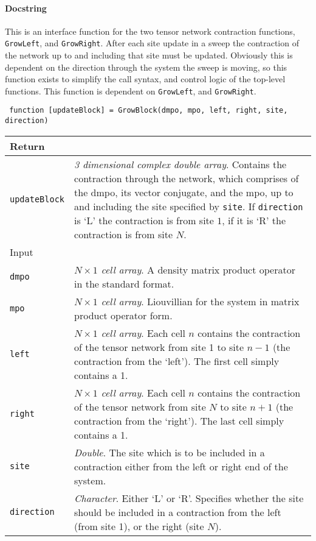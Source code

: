  \paragraph{Docstring} This is an interface function for the two tensor network contraction functions, \lstinline$GrowLeft$, and \lstinline$GrowRight$. After each site update in a sweep the contraction of the network up to and including that site must be updated. Obviously this is dependent on the direction through the system the sweep is moving, so this function exists to simplify the call syntax, and control logic of the top-level functions. This function is dependent on \lstinline$GrowLeft$, and \lstinline$GrowRight$.
 \begin{lstlisting}
 function [updateBlock] = GrowBlock(dmpo, mpo, left, right, site, direction) \end{lstlisting}
 \begin{longtabu}{X[1,1]X[4,1]}
 \hline
 Return & \\ \hline
 \lstinline$updateBlock$ & \emph{3 dimensional complex double array}. Contains the contraction through the network, which comprises of the dmpo, its vector conjugate, and the mpo, up to and including the site specified by \lstinline$site$. If \lstinline$direction$ is `L' the contraction is from site \(1\), if it is `R' the contraction is from site \(N\). \\ \hline
 Input & \\ \hline
 \lstinline$dmpo$ & \emph{\(N \times 1\) cell array}. A density matrix product operator in the standard format. \\
 \lstinline$mpo$ & \emph{\(N \times 1\) cell array}. Liouvillian for the system in matrix product operator form. \\
 \lstinline$left$ & \emph{\(N \times 1\) cell array}. Each cell \(n\) contains the contraction of the tensor network from site 1 to site \(n-1\) (the contraction from the `left'). The first cell simply contains a 1. \\
 \lstinline$right$ & \emph{\(N \times 1\) cell array}. Each cell \(n\) contains the contraction of the tensor network from site \(N\) to site \(n+1\) (the contraction from the `right'). The last cell simply contains a 1. \\
 \lstinline$site$ & \emph{Double}. The site which is to be included in a contraction either from the left or right end of the system.  \\
 \lstinline$direction$ & \emph{Character}. Either `L' or `R'. Specifies whether the site should be included in a contraction from the left (from site 1), or the right (site \(N\)). \\ 
 \hline
 \end{longtabu}
